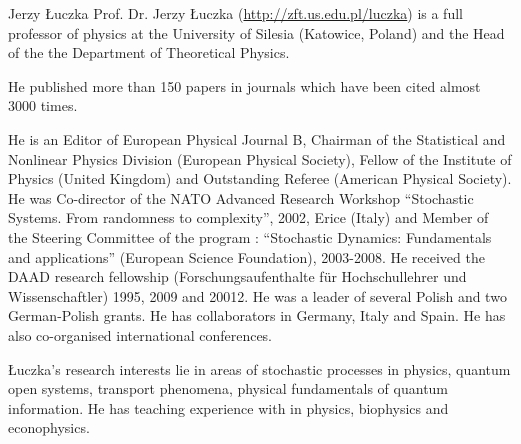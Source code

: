\begin{participant}[type=PI,PM=6,gender=male]{Jerzy Łuczka}
Prof. Dr. Jerzy Łuczka (\url{http://zft.us.edu.pl/luczka}) is
a full professor of physics at the University of Silesia (Katowice,
Poland) and the Head of the the Department of Theoretical Physics.

He published more than 150 papers in journals  which have been cited almost 3000 times.

He is an Editor of European Physical Journal B, Chairman of the
Statistical and Nonlinear Physics Division (European Physical
Society), Fellow of the Institute of Physics (United Kingdom) and
Outstanding Referee (American Physical Society). He was Co-director of
the NATO Advanced Research Workshop ``Stochastic Systems. From
randomness to complexity'', 2002, Erice (Italy) and Member of the
Steering Committee of the program : ``Stochastic Dynamics: Fundamentals
and applications'' (European Science Foundation), 2003-2008.  He
received the DAAD research fellowship (Forschungsaufenthalte für
Hochschullehrer und Wissenschaftler) 1995, 2009 and 20012. He was a
leader of several Polish and two German-Polish grants. He has
collaborators in Germany, Italy and Spain. He has also co-organised
international conferences.

Łuczka’s research interests lie in areas of stochastic processes in
physics, quantum open systems, transport phenomena, physical
fundamentals of quantum information. He has teaching experience with
\Sage in physics, biophysics and econophysics.


\end{participant}
